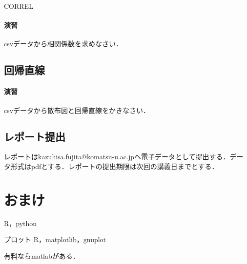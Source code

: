 CORREL

\paragraph{演習}
csvデータから相関係数を求めなさい．

\subsection{回帰直線}



\paragraph{演習}

csvデータから散布図と回帰直線をかきなさい．


\subsection{レポート提出}

レポートはkazuhisa.fujita@komatsu-u.ac.jpへ電子データとして提出する．データ形式はpdfとする．レポートの提出期限は次回の講義日までとする．

\section{おまけ}

R，python

プロット
R，matplotlib，gnuplot


有料ならmatlabがある．
